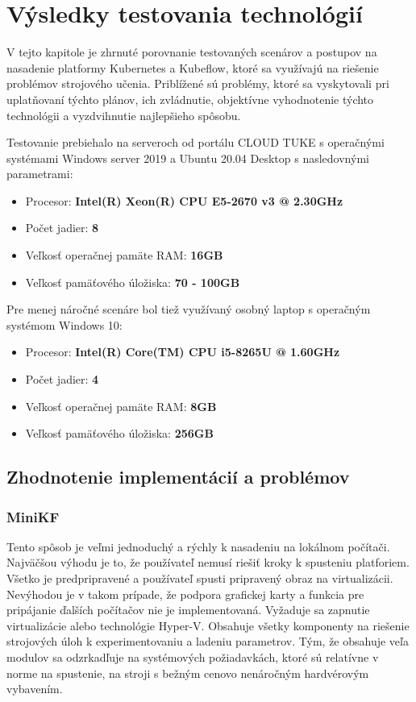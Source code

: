 
\chapter{Výsledky testovania technológií}
\label{evaluation}

V tejto kapitole je zhrnuté porovnanie testovaných scenárov a postupov na nasadenie platformy Kubernetes a Kubeflow, ktoré sa využívajú na riešenie problémov strojového učenia. Priblížené sú problémy, ktoré sa vyskytovali pri uplatňovaní týchto plánov, ich zvládnutie, objektívne vyhodnotenie týchto technológii a vyzdvihnutie najlepšieho spôsobu.

Testovanie prebiehalo na serveroch od portálu CLOUD TUKE s operačnými systémami Windows server 2019 a Ubuntu 20.04 Desktop s nasledovnými parametrami:

\begin{itemize}
	\item Procesor: \textbf{Intel(R) Xeon(R) CPU E5-2670 v3 @ 2.30GHz}
	\item Počet jadier: \textbf{8}
    \item Veľkosť operačnej pamäte RAM: \textbf{16GB}
    \item Veľkosť pamäťového úložiska: \textbf{70 - 100GB}
\end{itemize}

Pre menej náročné scenáre bol tiež využívaný osobný laptop s operačným systémom Windows 10:

\begin{itemize}
	\item Procesor: \textbf{Intel(R) Core(TM) CPU i5-8265U @ 1.60GHz}
	\item Počet jadier: \textbf{4}
    \item Veľkosť operačnej pamäte RAM: \textbf{8GB}
    \item Veľkosť pamäťového úložiska: \textbf{256GB}
\end{itemize}

\section{Zhodnotenie implementácií a problémov}

\subsection*{MiniKF}

Tento spôsob je veľmi jednoduchý a rýchly k nasadeniu na lokálnom počítači. Najväčšou výhodu je to, že používateľ nemusí riešiť kroky k spusteniu platforiem. Všetko je predpripravené a používateľ spusti pripravený obraz na virtualizácii. Nevýhodou je v takom prípade, že podpora grafickej karty a funkcia pre pripájanie ďalších počítačov nie je implementovaná. Vyžaduje sa zapnutie virtualizácie alebo technológie Hyper-V. Obsahuje všetky komponenty na riešenie strojových úloh k experimentovaniu a ladeniu parametrov. Tým, že obsahuje veľa modulov sa odzrkadľuje na systémových požiadavkách, ktoré sú relatívne v norme na spustenie, na stroji s bežným cenovo nenáročným hardvérovým vybavením.

